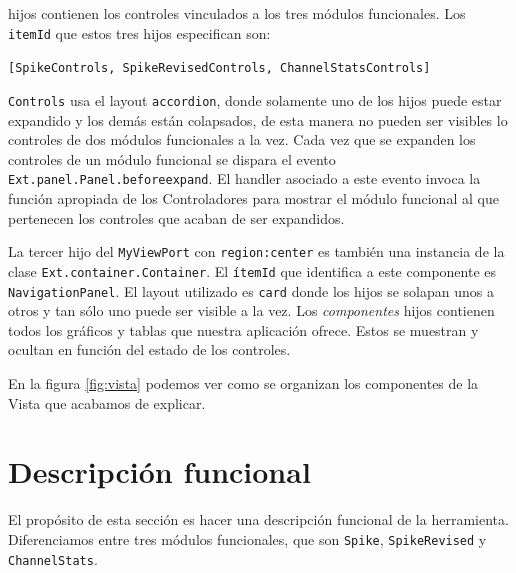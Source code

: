 	hijos contienen los controles vinculados a los tres módulos funcionales. Los \texttt{itemId} que estos tres hijos especifican son:
    		\begin{center} \texttt{[SpikeControls, SpikeRevisedControls, ChannelStatsControls]}  \end{center}
	\texttt{Controls} usa el layout \texttt{accordion}, donde solamente uno de los hijos puede estar expandido y los demás están
	colapsados, de esta manera no pueden ser visibles lo controles de dos módulos funcionales a la vez. Cada vez que se expanden los
	controles de un módulo funcional se dispara el evento \texttt{Ext.panel.Panel.beforeexpand}. El handler asociado a este evento
	invoca la función apropiada de los Controladores para mostrar el módulo funcional al que pertenecen los controles que acaban de ser
	expandidos.
	\par
	La tercer hijo del \texttt{MyViewPort} con \texttt{region:center} es también una instancia de la clase \texttt{Ext.container.Container}. El
	\texttt{ítemId} que identifica a este componente es \texttt{NavigationPanel}. El layout utilizado es \texttt{card} donde los hijos se solapan
	unos a otros y tan sólo uno puede ser visible a la vez. Los \emph{componentes} hijos contienen todos los gráficos y tablas que nuestra
	aplicación ofrece. Estos se muestran y ocultan en función del estado de los controles.
	\par
	En la figura \ref{fig:vista} podemos ver como se organizan los componentes de la Vista que acabamos de explicar.
\section{Descripción funcional}
	El propósito de esta sección es hacer una descripción funcional de la herramienta. Diferenciamos entre tres módulos funcionales, que son
	\texttt{Spike}, \texttt{SpikeRevised} y \texttt{ChannelStats}.
